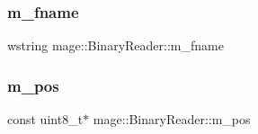 \subsubsection{\texorpdfstring{m\+\_\+fname}{m\_fname}}
{\footnotesize\ttfamily wstring mage\+::\+Binary\+Reader\+::m\+\_\+fname\hspace{0.3cm}{\ttfamily [private]}}

\hypertarget{classmage_1_1_binary_reader_a086c8b8615dddb15a97acf657bb4d73b}{}\label{classmage_1_1_binary_reader_a086c8b8615dddb15a97acf657bb4d73b} 
\subsubsection{\texorpdfstring{m\+\_\+pos}{m\_pos}}
{\footnotesize\ttfamily const uint8\+\_\+t$\ast$ mage\+::\+Binary\+Reader\+::m\+\_\+pos\hspace{0.3cm}{\ttfamily [private]}}


